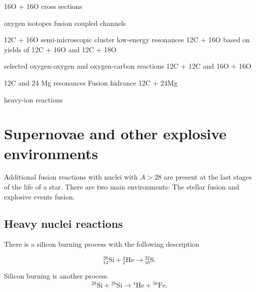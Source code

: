 \documentclass[openany]{book}
\begin{document}
16O + 16O cross sections \cite{duarte_gasques_oliveira_zagatto_chamon_medina_added_seale_alcantara-nunez_rossi_et_2015}
\cite{kuronen_keinonen_tikkanen_1987}

oxygen isotopes fusion \cite{thomas_chen_hinds_meredith_olson_1986}
coupled channels \cite{guimin_deji_xiaowu_1992}

12C + 16O semi-microscopic cluster \cite{ferreira_lubian_linares_ermamatov_yepez-martinez_hess_2019}
low-energy resonances \cite{torilov_maltsev_zherebchevsky_2021}
12C + 16O based on yields of 12C + 16O and 12C + 18O \cite{chan_bohn_vandenbosch_sielemann_cramer_bernhardt_bhang_chiang_1979}

selected oxygen-oxygen and oxygen-carbon reactions \cite{kovar_geesaman_braid_eisen_henning_ophel_paul_rehm_sanders_sperr_et_1979}
\cite{wang_ren_bai_2020}
12C + 12C and 16O + 16O \cite{assuncao_descouvemont_2015}

12C and 24 Mg resonances \cite{descouvemont_2021}
Fusion hidrance 12C + 24Mg \cite{montagnoli_stefanini_jiang_colucci_goasduff_brugnara_mazzocco_siciliano_scarlassara_corradi_et_2020}

heavy-ion  reactions \cite{nobre_chamon_gasques_carlson_thompson_2007}


\section{Supernovae and other explosive environments} \label{sec:explosive}

Additional fusion reactions with nuclei with $A > 28$ are present at the last stages of the life of a star. There are two main environments: The stellar fusion and explosive events fusion.


\subsection{Heavy nuclei reactions}

There is a silicon burning process with the following description 

\begin{equation}
	\mathrm{{}^{28}_{14}Si +{}^{4}_{2}He \rightarrow {}^{32}_{16}S}.
\end{equation}

Silicon burning is another process.\\

\begin{equation}
	\mathrm{{}^{28}Si + {}^{28}Si \rightarrow {}^{4}He + {}^{56}Fe }.
\end{equation}
\end{document}
